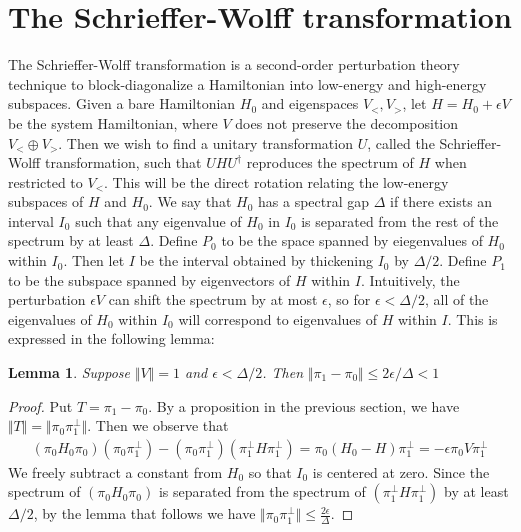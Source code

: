 \documentclass[11pt]{article}
\newtheorem{lem}{Lemma}
\begin{document}
\section{The Schrieffer-Wolff transformation}
The Schrieffer-Wolff transformation is a second-order perturbation theory technique to block-diagonalize a Hamiltonian into low-energy and high-energy subspaces. Given a bare Hamiltonian $H_0$ and eigenspaces $V_{<}, V_{>}$, let $H = H_0 + \epsilon V$ be the system Hamiltonian, where $V$ does not preserve the decomposition $V_{<}\oplus V_{>}$. Then we wish to find a unitary transformation $U$, called the Schrieffer-Wolff transformation, such that $UHU^\dagger$ reproduces the spectrum of $H$ when restricted to $V_{<}$. This will be the direct rotation relating the low-energy subspaces of $H$ and $H_0$. We say that $H_0$ has a spectral gap $\Delta$ if there exists an interval $I_0$ such that any eigenvalue of $H_0$ in $I_0$ is separated from the rest of the spectrum by at least $\Delta$. Define $P_0$ to be the space spanned by eiegenvalues of $H_0$ within $I_0$. Then let $I$ be the interval obtained by thickening $I_0$ by $\Delta/2$. Define $P_1$ to be the subspace spanned by eigenvectors of $H$ within $I$. Intuitively, the perturbation $\epsilon V$ can shift the spectrum by at most $\epsilon$, so for $\epsilon < \Delta/2$, all of the eigenvalues of $H_0$ within $I_0$ will correspond to eigenvalues of $H$ within $I$. This is expressed in the following lemma:
\begin{lem}
Suppose $\Vert V \Vert = 1$ and $\epsilon < \Delta /2$. Then $\Vert \pi_1 - \pi_0 \Vert \leq 2\epsilon/\Delta < 1$
\end{lem}
\begin{proof}
    Put $T = \pi_1 - \pi_0$. By a proposition in the previous section, we have $\Vert T \Vert = \Vert \pi_0  \pi_1^\perp \Vert$. Then we observe that
    \begin{align}
        (\pi_0 H_0 \pi_0)(\pi_0 \pi_1^\perp) - (\pi_0 \pi_1^\perp)(\pi_1^\perp H \pi_1^\perp) = \pi_0(H_0 - H)\pi_1^\perp = -\epsilon \pi_0 V \pi_1^\perp
    \end{align}
    We freely subtract a constant from $H_0$ so that $I_0$ is centered at zero. Since the spectrum of $(\pi_0 H_0 \pi_0)$ is separated from the spectrum of $(\pi_1^\perp H \pi_1^\perp)$ by at least $\Delta/2$, by the lemma that follows we have $\Vert \pi_0 \pi_1^\perp \Vert \leq \frac{2\epsilon}{\Delta}$. 
\end{proof}
\end{document}
